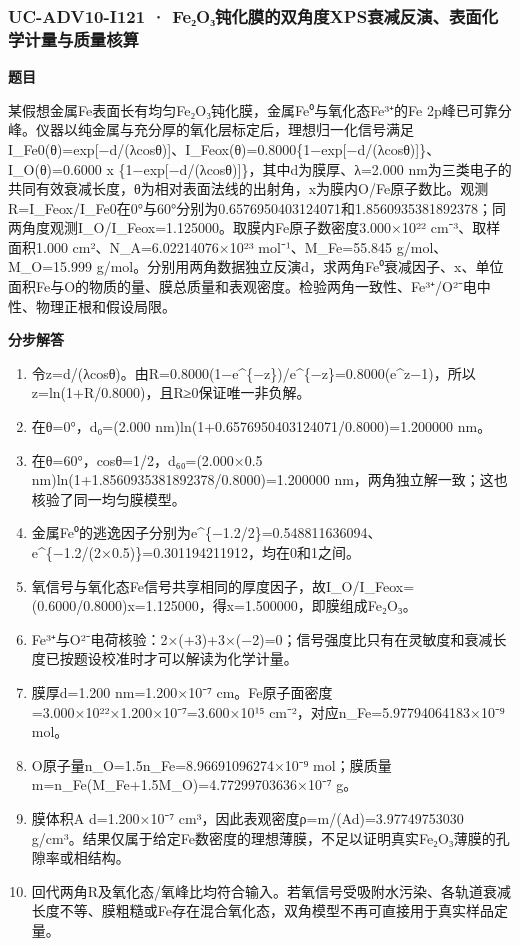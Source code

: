 \documentclass[UTF8,11pt,a4paper]{ctexart}
\begin{document}
\subsubsection*{UC-ADV10-I121 · Fe₂O₃钝化膜的双角度XPS衰减反演、表面化学计量与质量核算}
\noindent\textbf{题目}\par
某假想金属Fe表面长有均匀Fe₂O₃钝化膜，金属Fe⁰与氧化态Fe³⁺的Fe 2p峰已可靠分峰。仪器以纯金属与充分厚的氧化层标定后，理想归一化信号满足 I\_Fe0(θ)=exp[−d/(λcosθ)]、I\_Feox(θ)=0.8000\{1−exp[−d/(λcosθ)]\}、I\_O(θ)=0.6000 x \{1−exp[−d/(λcosθ)]\}，其中d为膜厚、λ=2.000 nm为三类电子的共同有效衰减长度，θ为相对表面法线的出射角，x为膜内O/Fe原子数比。观测R=I\_Feox/I\_Fe0在0°与60°分别为0.6576950403124071和1.8560935381892378；同两角度观测I\_O/I\_Feox=1.125000。取膜内Fe原子数密度3.000×10²² cm⁻³、取样面积1.000 cm²、N\_A=6.02214076×10²³ mol⁻¹、M\_Fe=55.845 g/mol、M\_O=15.999 g/mol。分别用两角数据独立反演d，求两角Fe⁰衰减因子、x、单位面积Fe与O的物质的量、膜总质量和表观密度。检验两角一致性、Fe³⁺/O²⁻电中性、物理正根和假设局限。\par
\medskip\noindent\textbf{分步解答}
\begin{enumerate}
\item 令z=d/(λcosθ)。由R=0.8000(1−e\textasciicircum{}\{−z\})/e\textasciicircum{}\{−z\}=0.8000(e\textasciicircum{}z−1)，所以z=ln(1+R/0.8000)，且R≥0保证唯一非负解。
\item 在θ=0°，d₀=(2.000 nm)ln(1+0.6576950403124071/0.8000)=1.200000 nm。
\item 在θ=60°，cosθ=1/2，d₆₀=(2.000×0.5 nm)ln(1+1.8560935381892378/0.8000)=1.200000 nm，两角独立解一致；这也核验了同一均匀膜模型。
\item 金属Fe⁰的逃逸因子分别为e\textasciicircum{}\{−1.2/2\}=0.548811636094、e\textasciicircum{}\{−1.2/(2×0.5)\}=0.301194211912，均在0和1之间。
\item 氧信号与氧化态Fe信号共享相同的厚度因子，故I\_O/I\_Feox=(0.6000/0.8000)x=1.125000，得x=1.500000，即膜组成Fe₂O₃。
\item Fe³⁺与O²⁻电荷核验：2×(+3)+3×(−2)=0；信号强度比只有在灵敏度和衰减长度已按题设校准时才可以解读为化学计量。
\item 膜厚d=1.200 nm=1.200×10⁻⁷ cm。Fe原子面密度=3.000×10²²×1.200×10⁻⁷=3.600×10¹⁵ cm⁻²，对应n\_Fe=5.97794064183×10⁻⁹ mol。
\item O原子量n\_O=1.5n\_Fe=8.96691096274×10⁻⁹ mol；膜质量m=n\_Fe(M\_Fe+1.5M\_O)=4.77299703636×10⁻⁷ g。
\item 膜体积A d=1.200×10⁻⁷ cm³，因此表观密度ρ=m/(Ad)=3.97749753030 g/cm³。结果仅属于给定Fe数密度的理想薄膜，不足以证明真实Fe₂O₃薄膜的孔隙率或相结构。
\item 回代两角R及氧化态/氧峰比均符合输入。若氧信号受吸附水污染、各轨道衰减长度不等、膜粗糙或Fe存在混合氧化态，双角模型不再可直接用于真实样品定量。
\end{enumerate}
\end{document}
